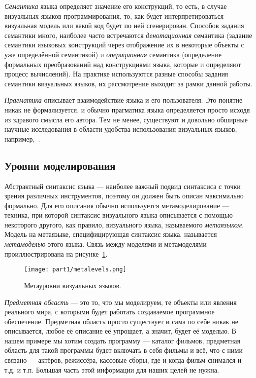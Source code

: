 \textit{Семантика} языка определяет значение его конструкций, то есть, в случае визуальных
языков программирования, то, как будет интерпретироваться визуальная модель или какой
код будет по ней сгенерирован. Способов задания семантики много, наиболее часто встречаются
\textit{денотационная} семантика (задание семантики языковых конструкций через отображение их
в некоторые объекты с уже определённой семантикой) и \textit{операционная} семантика
(определение формальных преобразований над конструкциями языка, которые и определяют процесс вычислений).
На практике используются разные способы задания семантики визуальных языков, их рассмотрение 
выходит за рамки данной работы.

\textit{Прагматика} описывает взаимодействие языка и его пользователя. Это понятие никак
не формализуется, и обычно прагматика языка определяется просто исходя из здравого
смысла его автора. Тем не менее, существуют и довольно обширные научные исследования
в области удобства использования визуальных языков, например,~\cite{parondzhanov2001drakon}.

\subsection{Уровни моделирования}
Абстрактный синтаксис языка --- наиболее важный подвид синтаксиса с точки зрения 
различных инструментов, поэтому он должен быть описан максимально формально. Для его 
описания обычно используется метамоделирование --- техника, при которой 
синтаксис визуального языка описывается с помощью некоторого другого, как правило,
визуального языка, называемого \textit{метаязыком}. Модель на метаязыке, специфицирующая 
синтаксис языка, называется \textit{метамоделью} этого языка. Связь между моделями и 
метамоделями проиллюстрирована на рисунке~\ref{metalevels}.

\begin{figure} [ht]
	\begin{center}
		\texttt{[image: part1/metalevels.png]}
		\caption{Метауровни визуальных языков.}
		\label{metalevels}
	\end{center}
\end{figure}

\textit{Предметная область} --- это то, что мы моделируем, те объекты или явления 
реального мира, с которыми будет работать создаваемое программное обеспечение. 
Предметная область просто существует и сама по себе никак не описывается, любое 
её описание её упрощает, а значит, будет её моделью. В нашем примере мы хотим 
создать программу --- каталог фильмов, предметная область для такой программы 
будет включать в себя фильмы и всё, что с ними связано --- актёров, режиссёра, 
кассовые сборы, где и когда фильм снимался и т.д. и т.п. Большая часть этой 
информации для наших целей не нужна.

